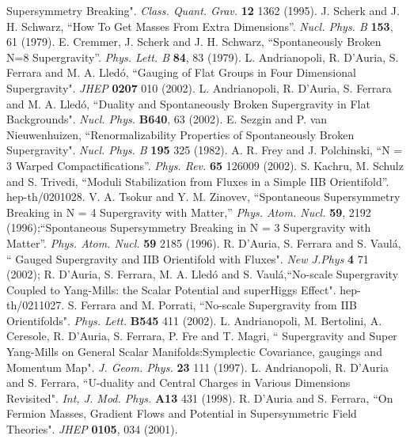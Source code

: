 \documentclass[a4paper,12pt]{article}
\begin{document}
\begin{thebibliography}{99}
Supersymmetry Breaking". {\it Class. Quant. Grav.} {\bf 12} 1362 (1995).
J. Scherk and J. H. Schwarz, ``How To Get Masses From Extra
Dimensions''. {\it Nucl. Phys. B} {\bf 153}, 61 (1979).
 E. Cremmer, J. Scherk and J. H. Schwarz,
 ``Spontaneously Broken N=8 Supergravity''.
{\it Phys. Lett. B} {\bf 84}, 83 (1979).
 L. Andrianopoli, R. D'Auria, S. Ferrara and M. A. Lled\'o, ``Gauging of Flat
Groups in Four Dimensional Supergravity". {\it JHEP} {\bf 0207} 010 (2002).
 L. Andrianopoli, R. D'Auria, S. Ferrara and M. A. Lled\'o, ``Duality and
Spontaneously Broken Supergravity in Flat Backgrounds".
{\it  Nucl. Phys. } {\bf B640}, 63 (2002).
E. Sezgin and P. van Nieuwenhuizen, ``Renormalizability Properties
of Spontaneously Broken \coordHE{} Supergravity". {\it Nucl. Phys. B}
{\bf 195}  325 (1982).
A. R. Frey and J. Polchinski, ``N = 3 Warped Compactifications''. {\it Phys. Rev.}  {\bf 65}
126009 (2002).
S. Kachru, M. Schulz and S. Trivedi,
 ``Moduli Stabilization from Fluxes in a Simple IIB Orientifold''.
 hep-th/0201028.
V. A. Tsokur and Y. M. Zinovev, ``Spontaneous Supersymmetry
Breaking in N = 4 Supergravity with Matter,'' {\it Phys.  Atom.
Nucl.}  {\bf 59}, 2192 (1996);``Spontaneous Supersymmetry Breaking
in N = 3 Supergravity with Matter''. {\it Phys.  Atom.  Nucl.}
{\bf 59} 2185 (1996).
 R. D'Auria, S. Ferrara and  S. Vaul\'a, ``\coordHE{} Gauged Supergravity and IIB
Orientifold with Fluxes". {\it New J.Phys} {\bf 4} 71 (2002);
R. D'Auria, S. Ferrara, M. A. Lled\'o and S. Vaul\'a,``No-scale
\coordHE{} Supergravity Coupled to Yang-Mills: the Scalar Potential and
superHiggs Effect". hep-th/0211027.
 S. Ferrara and M. Porrati, ``No-scale Supergravity from IIB Orientifolds".  {\it
Phys. Lett.} {\bf B545} 411 (2002).
 L. Andrianopoli, M. Bertolini, A. Ceresole, R. D'Auria, S. Ferrara, P. Fre and T.
Magri,
``\coordHE{} Supergravity and \coordHE{} Super Yang-Mills on General Scalar Manifolds:Symplectic Covariance,
gaugings and Momentum Map". {\it J. Geom. Phys.} {\bf 23} 111 (1997).
 L. Andrianopoli, R. D'Auria and  S. Ferrara, ``U-duality and Central Charges in Various
Dimensions Revisited". {\it Int, J. Mod. Phys. } {\bf A13} 431 (1998).
  R. D'Auria and S. Ferrara, ``On Fermion Masses, Gradient Flows and Potential in
Supersymmetric Field Theories". {\it JHEP} {\bf 0105}, 034 (2001).

\end{thebibliography}
\end{document}
